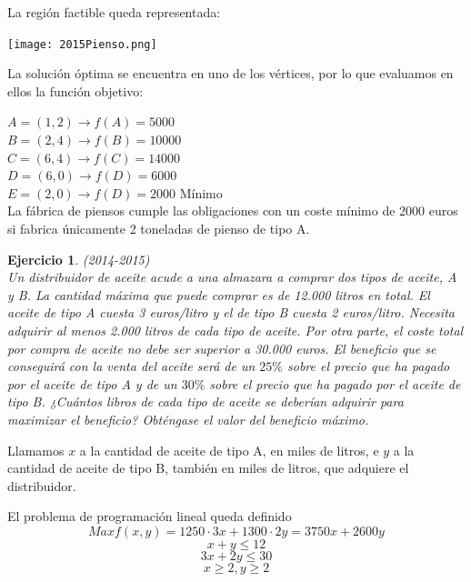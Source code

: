 \documentclass[12pt, a4paper]{amsart}
\newtheorem{ejer}{Ejercicio}
\newcommand{\s}{\color[rgb]{0,0,0.5}}
\newcommand{\n}{\color[rgb]{0,0,0}}
\begin{document}
\newpage

La región factible queda representada:

\begin{center}
\texttt{[image: 2015Pienso.png]}
\end{center}



La solución óptima se encuentra en uno de los vértices, por lo que evaluamos en ellos la función objetivo:

 
$A=(1,2) \rightarrow f(A)=5000$ \\

$B=(2,4) \rightarrow f(B)=10000$\\

$C=(6,4) \rightarrow f(C)=14000$\\

$D=(6,0) \rightarrow f(D)=6000$\\

$E=(2,0) \rightarrow f(D)=2000$ Mínimo\\

La fábrica de piensos cumple las obligaciones con un coste mínimo de 2000 euros si fabrica únicamente 2 toneladas de pienso de tipo A.

\n



\begin{ejer}\em (2014-2015)\\
Un distribuidor de aceite acude a una almazara a comprar dos tipos de aceite, A y B. La cantidad máxima que puede comprar es de 12.000 litros en total. El aceite de tipo A cuesta 3 euros/litro y el de tipo B cuesta 2 euros/litro. Necesita adquirir al menos 2.000 litros de cada tipo de aceite. Por otra parte, el coste total por compra de aceite no debe ser superior a 30.000 euros. El beneficio que se conseguirá con la venta del aceite será de un $25\%$ sobre el precio que ha pagado por el aceite de tipo A y de un $30\%$ sobre el precio que ha pagado por el aceite de tipo B. ¿Cuántos libros de cada tipo de aceite se deberían adquirir para maximizar el beneficio? Obténgase el valor del beneficio máximo.
\end{ejer}
\s

Llamamos $x$ a la cantidad de aceite de tipo A, en miles de litros, e $y$ a la cantidad de aceite de tipo B, también en miles de litros, que adquiere el distribuidor.

El problema de programación lineal queda definido
\[Max f(x,y)= 1250\cdot 3x+1300\cdot 2y=3750x+2600y\]
\[x+y\leqslant 12\]
\[3x+2y\leqslant 30\]
\[x\geqslant 2, y\geqslant 2\]
\end{document}
